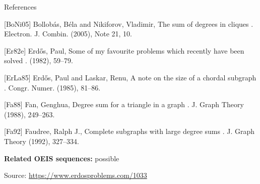 \documentclass{article}
\begin{document}
References

[BoNi05] Bollob\'{a}s, B\'ela and Nikiforov, Vladimir, The sum of degrees in cliques . Electron. J. Combin. (2005), Note 21, 10.

[Er82e] Erd\H{o}s, Paul, Some of my favourite problems which recently have been solved . (1982), 59--79.

[ErLa85] Erd\H{o}s, Paul and Laskar, Renu, A note on the size of a chordal subgraph . Congr. Numer. (1985), 81--86.

[Fa88] Fan, Genghua, Degree sum for a triangle in a graph . J. Graph Theory (1988), 249--263.

[Fa92] Faudree, Ralph J., Complete subgraphs with large degree sums . J. Graph Theory (1992), 327--334.

\noindent\textbf{Related OEIS sequences:} possible


\bigskip
\noindent\small{Source: \url{https://www.erdosproblems.com/1033}}
\end{document}

